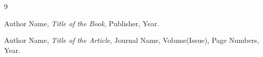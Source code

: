 \documentclass[12pt]{article}
\begin{document}









































\newpage
\begin{thebibliography}{9}

Author Name,
\textit{Title of the Book},
Publisher, Year.

Author Name,
\textit{Title of the Article},
Journal Name, Volume(Issue), Page Numbers, Year.

\end{thebibliography}
\end{document}
